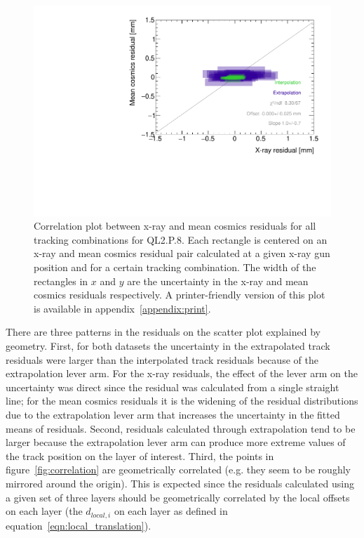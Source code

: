 \begin{figure}
    \centering
    \includegraphics[width = \textwidth]{figures/figure_QL2P08_3100V_2021-08-16_QL2P08_local_cosmic_and_xray_data_correlation_plot.pdf}
    \caption{Correlation plot between x-ray and mean cosmics residuals for all tracking combinations for QL2.P.8. Each rectangle is centered on an x-ray and mean cosmics residual pair calculated at a given x-ray gun position and for a certain tracking combination. The width of the rectangles in $x$ and $y$ are the uncertainty in the x-ray and mean cosmics residuals respectively. A printer-friendly version of this plot is available in appendix~\ref{appendix:print}.}
    \label{fig:no_correlation}
\end{figure}

There are three patterns in the residuals on the scatter plot explained by geometry. First, for both datasets the uncertainty in the extrapolated track residuals were larger than the interpolated track residuals because of the extrapolation lever arm. For the x-ray residuals, the effect of the lever arm on the uncertainty was direct since the residual was calculated from a single straight line; for the mean cosmics residuals it is the widening of the residual distributions due to the extrapolation lever arm that increases the uncertainty in the fitted means of residuals. Second, residuals calculated through extrapolation tend to be larger because the extrapolation lever arm can produce more extreme values of the track position on the layer of interest. Third, the points in figure~\ref{fig:correlation} are geometrically correlated (e.g. they seem to be roughly mirrored around the origin). This is expected since the residuals calculated using a given set of three layers should be geometrically correlated by the local offsets on each layer (the $d_{local, i}$ on each layer as defined in equation~\ref{eqn:local_translation}). 

